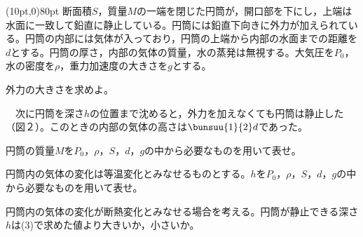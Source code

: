 \hakosyokika
\item
    \begin{mawarikomi}(10pt,0){80pt}{}
        断面積$S$，質量$M$の一端を閉じた円筒が，開口部を下にし，上端は水面に一致して鉛直に静止している。円筒には鉛直下向きに外力が加えられている。円筒の内部には気体が入っており，円筒の上端から内部の水面までの距離を$d$とする。円筒の厚さ，内部の気体の質量，水の蒸発は無視する。大気圧を$P_0$，水の密度を$\rho $，重力加速度の大きさを$g$とする。
        \begin{Enumerate}
            \item 外力の大きさを求めよ。
        \end{Enumerate}
        ~~次に円筒を深さ$h$の位置まで沈めると，外力を加えなくても円筒は静止した（図２）。このときの内部の気体の高さは$\bunsuu{1}{2}d$であった。
        \begin{Enumerate*}
            \item 円筒の質量$M$を$P_0$，$\rho $，$S$，$d$，$g$の中から必要なものを用いて表せ。
            \item 円筒内の気体の変化は等温変化とみなせるものとする。$h$を$P_0$，$\rho $，$S$，$d$，$g$の中から必要なものを用いて表せ。
            \item 円筒内の気体の変化が断熱変化とみなせる場合を考える。円筒が静止できる深さ$h$は(3)で求めた値より大きいか，小さいか。
        \end{Enumerate*}
    \end{mawarikomi}